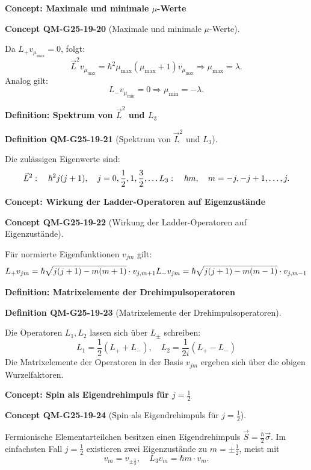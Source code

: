 \documentclass[10pt, letterpaper]{article}
\newcommand{\CustomHeading}[3]{%
  \par\medskip\noindent%
  \textbf{#1 #2} \textnormal{(#3)}.\enskip%
}
\newenvironment{DEF}[2]{\begin{unitbox}\CustomHeading{Definition}{#1}{#2}}{\end{unitbox}}
\newenvironment{CONC}[2]{\begin{unitbox}\CustomHeading{Concept}{#1}{#2}}{\end{unitbox}}
\begin{document}
\textbf{Concept: Maximale und minimale \(\mu\)-Werte}  

\begin{CONC}{QM-G25-19-20}{Maximale und minimale \(\mu\)-Werte}
Da \(L_+ v_{\mu_{\text{max}}} = 0\), folgt:
$$
\vec{L}^2 v_{\mu_{\text{max}}} = \hbar^2 \mu_{\text{max}} (\mu_{\text{max}} + 1) v_{\mu_{\text{max}}}
\Rightarrow \mu_{\text{max}} = \lambda.
$$
Analog gilt:
$$
L_- v_{\mu_{\text{min}}} = 0 \Rightarrow \mu_{\text{min}} = -\lambda.
$$
\end{CONC}


\textbf{Definition: Spektrum von \(\vec{L}^2\) und \(L_3\)}


\begin{DEF}{QM-G25-19-21}{Spektrum von \(\vec{L}^2\) und \(L_3\)}
Die zulässigen Eigenwerte sind:
$$
\vec{L}^2: \quad \hbar^2 j(j+1), \quad j = 0, \frac{1}{2}, 1, \frac{3}{2}, \dots \\
L_3: \quad \hbar m, \quad m = -j, -j+1, \dots, j.
$$
\end{DEF}


\textbf{Concept: Wirkung der Ladder-Operatoren auf Eigenzustände}  


\begin{CONC}{QM-G25-19-22}{Wirkung der Ladder-Operatoren auf Eigenzustände}
Für normierte Eigenfunktionen \(v_{j m}\) gilt:
$$
L_+ v_{j m} = \hbar \sqrt{j(j+1) - m(m+1)} \cdot v_{j, m+1} \\
L_- v_{j m} = \hbar \sqrt{j(j+1) - m(m-1)} \cdot v_{j, m-1}
$$
\end{CONC}


\textbf{Definition: Matrixelemente der Drehimpulsoperatoren}


\begin{DEF}{QM-G25-19-23}{Matrixelemente der Drehimpulsoperatoren}
Die Operatoren \(L_1, L_2\) lassen sich über \(L_\pm\) schreiben:
$$
L_1 = \frac{1}{2}(L_+ + L_-), \quad L_2 = \frac{1}{2i}(L_+ - L_-)
$$
Die Matrixelemente der Operatoren in der Basis \(v_{j m}\) ergeben sich über die obigen Wurzelfaktoren.
\end{DEF}


\textbf{Concept: Spin als Eigendrehimpuls für \(j = \frac{1}{2}\)}


\begin{CONC}{QM-G25-19-24}{Spin als Eigendrehimpuls für \(j = \frac{1}{2}\)}
Fermionische Elementarteilchen besitzen einen Eigendrehimpuls \( \vec{S} = \frac{\hbar}{2} \vec{\sigma} \). Im einfachsten Fall \(j = \frac{1}{2}\) existieren zwei Eigenzustände zu \(m = \pm \frac{1}{2}\), meist mit
$$
v_{m} = v_{\pm \frac{1}{2}}, \quad L_3 v_m = \hbar m \cdot v_m.
$$
\end{CONC}
\end{document}
